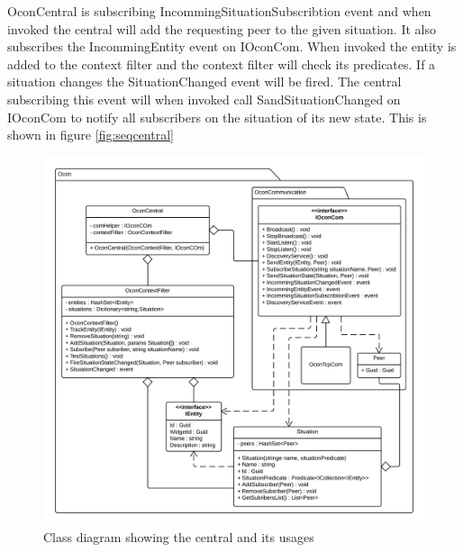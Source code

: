 \documentclass[../report.tex]{subfiles}
\begin{document}
OconCentral is subscribing IncommingSituationSubscribtion event and when invoked the central will add the requesting peer to the given situation. It also subscribes the IncommingEntity event on IOconCom. When invoked the entity is added to the context filter and the context filter will check its predicates. If a situation changes the SituationChanged event will be fired. The central subscribing this event will when invoked call SandSituationChanged on IOconCom to notify all subscribers on the situation of its new state. This is shown in figure \ref{fig:seqcentral}

\begin{figure}
\hspace{-70px}
\includegraphics[width=500px]{oconclassdiagram.png}
\caption{Class diagram showing the central and its usages}
\label{fig:oconclassdiagram}
\end{figure}
\end{document}
